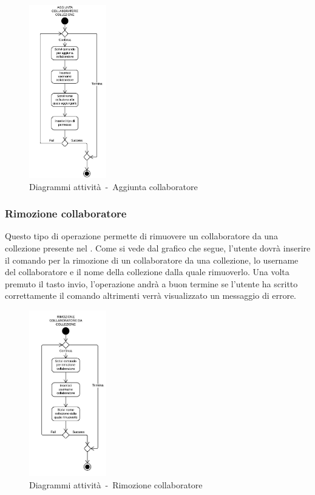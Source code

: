 \documentclass{scalatekids-article}
\begin{document}
\begin{figure}[H]
  \begin{center}
    \includegraphics[width=0.3\textwidth, keepaspectratio]{img/diagrammiAttivita/aggCollaboratore.jpeg}
    \caption{Diagrammi attività\ -\ Aggiunta collaboratore}
  \end{center}
\end{figure}

\subsubsection{Rimozione collaboratore}

Questo tipo di operazione permette di rimuovere un collaboratore da una
collezione presente nel . Come si vede dal grafico che segue, l'utente
dovrà inserire il comando per la rimozione di un collaboratore da una
collezione, lo username del collaboratore e il nome della collezione dalla
quale rimuoverlo. Una volta premuto il tasto invio, l'operazione andrà a buon
termine se l'utente ha scritto correttamente il comando altrimenti verrà
visualizzato un messaggio di errore.

\begin{figure}[H]
  \begin{center}
    \includegraphics[width=0.3\textwidth, keepaspectratio]{img/diagrammiAttivita/rimozioneCollaboratore.jpeg}
    \caption{Diagrammi attività\ -\ Rimozione collaboratore}
  \end{center}
\end{figure}
\end{document}
